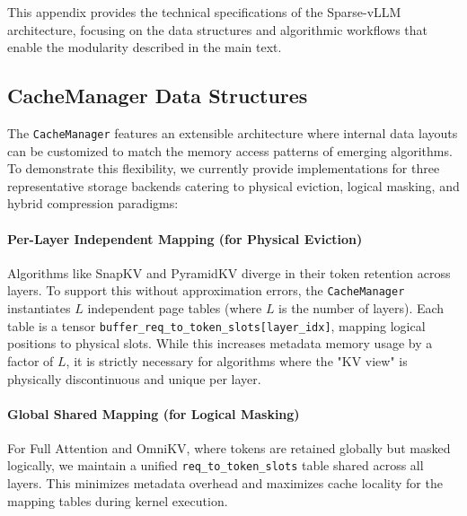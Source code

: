This appendix provides the technical specifications of the Sparse-vLLM architecture, focusing on the data structures and algorithmic workflows that enable the modularity described in the main text.


\subsection{CacheManager Data Structures}
\label{app:sparse_vllm:structures}

The \texttt{CacheManager} features an extensible architecture where internal data layouts can be customized to match the memory access patterns of emerging algorithms. To demonstrate this flexibility, we currently provide implementations for three representative storage backends catering to physical eviction, logical masking, and hybrid compression paradigms:

\paragraph{Per-Layer Independent Mapping (for Physical Eviction)} 
Algorithms like SnapKV and PyramidKV diverge in their token retention across layers. To support this without approximation errors, the \texttt{CacheManager} instantiates $L$ independent page tables (where $L$ is the number of layers). Each table is a tensor \texttt{buffer\_req\_to\_token\_slots[layer\_idx]}, mapping logical positions to physical slots. While this increases metadata memory usage by a factor of $L$, it is strictly necessary for algorithms where the "KV view" is physically discontinuous and unique per layer.

\paragraph{Global Shared Mapping (for Logical Masking)} 
For Full Attention and OmniKV, where tokens are retained globally but masked logically, we maintain a unified \texttt{req\_to\_token\_slots} table shared across all layers. This minimizes metadata overhead and maximizes cache locality for the mapping tables during kernel execution.

